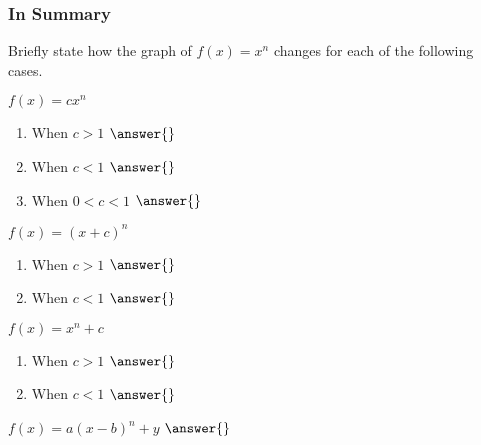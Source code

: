 \documentclass{ximera}
\begin{document}
\subsubsection{In Summary}
Briefly state how the graph of $f(x)=x^n$ changes for each of the following cases.
\begin{question}
$f(x)=cx^n$
\begin{enumerate}
\item When $c>1$ $\answer{}$
\item When $c<1$ $\answer{}$
\item When $0<c<1$ $\answer{}$
\end{enumerate}
$f(x)=(x+c)^n$
\begin{enumerate}
\item When $c>1$ $\answer{}$
\item When $c<1$ $\answer{}$
\end{enumerate}
$f(x)=x^n+c$
\begin{enumerate}
\item When $c>1$ $\answer{}$
\item When $c<1$ $\answer{}$
\end{enumerate}
$f(x)=a(x-b)^n+y$ $\answer{}$
\end{question}
\end{document}
